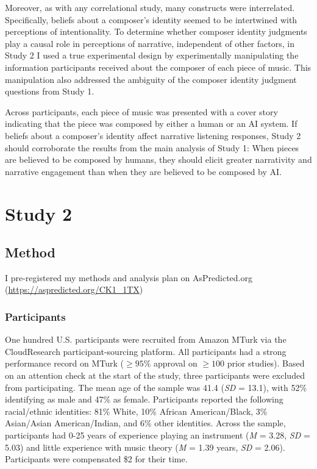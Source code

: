 \documentclass[12pt,twoside]{reedthesis}
\begin{document}
Moreover, as with any correlational study, many constructs were interrelated. Specifically, beliefs about a composer’s identity seemed to be intertwined with perceptions of intentionality. To determine whether composer identity judgments play a causal role in perceptions of narrative, independent of other factors, in Study 2 I used a true experimental design by experimentally manipulating the information participants received about the composer of each piece of music. This manipulation also addressed the ambiguity of the composer identity judgment questions from Study 1. 

Across participants, each piece of music was presented with a cover story indicating that the piece was composed by either a human or an AI system. If beliefs about a composer’s identity affect narrative listening responses, Study 2 should corroborate the results from the main analysis of Study 1: When pieces are believed to be composed by humans, they should elicit greater narrativity and narrative engagement than when they are believed to be composed by AI. 

\chapter*{Study 2}

\section*{Method}
I pre-registered my methods and analysis plan on AsPredicted.org (\url{https://aspredicted.org/CK1_1TX})
\subsection*{Participants}

One hundred U.S. participants were recruited from Amazon MTurk via the CloudResearch participant-sourcing platform. All participants had a strong performance record on MTurk ($\ge95\%$ approval on $\ge100$ prior studies). Based on an attention check at the start of the study, three participants were excluded from participating. The mean age of the sample was 41.4 (\emph{SD} = 13.1), with 52\% identifying as male and 47\% as female. Participants reported the following racial/ethnic identities: 81\% White, 10\% African American/Black, 3\% Asian/Asian American/Indian, and 6\% other identities. Across the sample, participants had 0-25 years of experience playing an instrument (\emph{M} = 3.28, \emph{SD} = 5.03) and little experience with music theory (\emph{M} = 1.39 years, \emph{SD} = 2.06). Participants were compensated \$2 for their time. 
\end{document}
